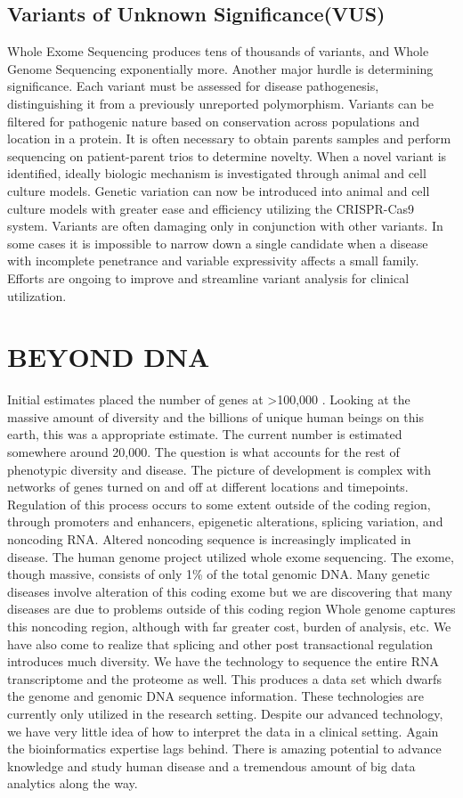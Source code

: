 \documentclass[sigconf]{acmart}
\begin{document}
\subsection{Variants of Unknown Significance(VUS)}
Whole Exome Sequencing produces tens of thousands of variants, and Whole Genome Sequencing exponentially more.  Another major hurdle is determining significance.  Each variant must be assessed for disease pathogenesis, distinguishing it from a previously unreported polymorphism. Variants can be filtered for pathogenic nature based on conservation across populations and location in a protein. It is often necessary to obtain parents samples and perform sequencing on patient-parent trios to determine novelty. When a novel variant is identified, ideally biologic mechanism is investigated through animal and cell culture models. Genetic variation can now be introduced into animal and cell culture models with greater ease and efficiency utilizing the CRISPR-Cas9 system. Variants are often damaging only in conjunction with other variants.  In some cases it is impossible to narrow down a single candidate when a disease with incomplete penetrance and variable expressivity affects a small family.  Efforts are ongoing to improve and streamline variant analysis for clinical utilization. 


\section{	BEYOND DNA}

Initial estimates placed the number of genes at >100,000
\cite{vanderbilt}.  Looking at the massive amount of diversity and the
billions of unique human beings on this earth, this was a appropriate
estimate.  The current number is estimated somewhere around 20,000.
The question is what accounts for the rest of phenotypic diversity and
disease.  The picture of  development is complex with networks of genes turned on and off at different locations and timepoints.  Regulation of this process occurs to some extent outside of the coding region, through promoters and enhancers, epigenetic alterations, splicing variation, and noncoding RNA.   Altered noncoding sequence is increasingly implicated in disease.  The human genome project utilized whole exome sequencing.  The exome, though massive, consists of
only 1\% of the total genomic DNA.  Many genetic diseases involve
alteration of this coding exome but we are discovering that many
diseases are due to problems outside of this coding region  Whole genome captures this noncoding region, although with far greater cost, burden of analysis, etc.   We have also come to realize that splicing and other
post transactional regulation introduces much diversity.  We have the
technology to sequence the entire RNA transcriptome and the proteome
as well.  This produces a data set which dwarfs the genome and genomic
DNA sequence information.  These technologies are currently only
utilized in the research setting.  Despite our advanced technology, we
have very little idea of how to interpret the data in a clinical
setting.  Again the bioinformatics expertise lags behind.  There is
amazing potential to advance knowledge and study human disease and a
tremendous amount of big data analytics along the way.
\end{document}
